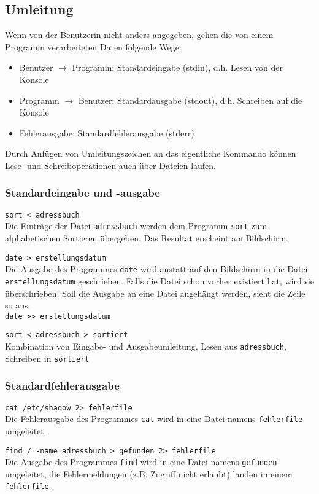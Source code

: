\documentclass[11pt]{article}
\begin{document}
\subsection{Umleitung}
Wenn von der Benutzerin nicht anders angegeben, gehen die von einem
Programm verarbeiteten Daten folgende Wege: 
\begin{itemize}
\item
Benutzer $ \rightarrow $ Programm: Standardeingabe
(stdin), d.h. Lesen von der Konsole 
\item
Programm $ \rightarrow $ Benutzer: Standardausgabe
(stdout), d.h. Schreiben auf die Konsole
\item
Fehlerausgabe: Standardfehlerausgabe (stderr)
\end{itemize}
Durch Anfügen von Umleitungszeichen an das eigentliche Kommando können
Lese- und Schreiboperationen auch über Dateien laufen.

\subsubsection{Standardeingabe und -ausgabe}
\texttt{sort < adressbuch} \\
Die Einträge der Datei \texttt{adressbuch} werden dem Programm
\texttt{sort} zum alphabetischen Sortieren übergeben. Das Resultat
erscheint am Bildschirm. 

\texttt{date > erstellungsdatum} \\
Die Ausgabe des Programmes \texttt{date} wird anstatt auf den
Bildschirm in die Datei \texttt{erstellungsdatum} geschrieben. Falls die
Datei schon vorher existiert hat, wird sie überschrieben. Soll die
Ausgabe an eine Datei angehängt werden, sieht die Zeile so aus:\\
\texttt{date >> erstellungsdatum} 

\texttt{sort < adressbuch > sortiert} \\
Kombination von Eingabe- und Ausgabeumleitung, Lesen aus
\texttt{adressbuch}, Schreiben in \texttt{sortiert} 

\subsubsection{Standardfehlerausgabe}
\texttt{cat /etc/shadow 2> fehlerfile} \\ 
Die Fehlerausgabe des Programmes \texttt{cat} wird in eine Datei namens
\texttt{fehlerfile} umgeleitet. 

\texttt{find / -name adressbuch > gefunden 2> fehlerfile} \\
Die Ausgabe des Programmes \texttt{find} wird in eine Datei namens
\texttt{gefunden} umgeleitet, die Fehlermeldungen (z.B. Zugriff nicht
erlaubt) landen in einem \texttt{fehlerfile}.
\end{document}
